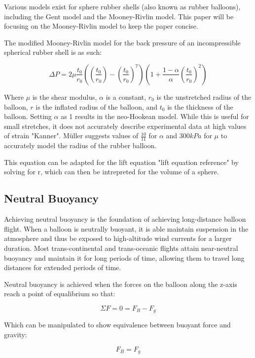 \documentclass[usenatbib]{mn2e}
\newcommand{\f}[2]{\frac{#1}{#2}}
\begin{document}
Various models exist for sphere rubber shells (also known as rubber balloons), including the Gent model and the Mooney-Rivlin model. This paper will be focusing on the Mooney-Rivlin model to keep the paper concise.

The modified Mooney-Rivlin model for the back pressure of an incompressible spherical rubber shell is as such:

\begin{equation}
\Delta P = 2\mu\frac{t_0}{r_0}((\frac{t_0}{r_0})-(\frac{t_0}{r_0})^7)(1+\frac{1-\alpha}{\alpha}(\frac{t_0}{r_0})^2)
\end{equation}

Where $\mu$ is the shear modulus, $\alpha$ is a constant, $r_0$ is the unstretched radius of the balloon, $r$ is the inflated radius of the balloon, and $t_0$ is the thickness of the balloon. Setting $\alpha$ as 1 results in the neo-Hookean model. While this is useful for small stretches, it does not accurately describe experimental data at high values of strain "Kanner". Müller suggests values of $\f{10}{11}$ for $\alpha$ and $300 kPa$ for $\mu$ to accurately model the radius of the rubber balloon.

This equation can be adapted for the lift equation "lift equation reference" by solving for r, which can then be intrepreted for the volume of a sphere.

\subsection{Neutral Buoyancy}

Achieving neutral buoyancy is the foundation of achieving long-distance balloon flight. When a balloon is neutrally buoyant, it is able maintain suspension in the atmosphere and thus be exposed to high-altitude wind currents for a larger duration. Most trans-continental and trans-oceanic flights attain near-neutral buoyancy and maintain it for long periods of time, allowing them to travel long distances for extended periods of time.

Neutral buoyancy is achieved when the forces on the balloon along the z-axis reach a point of equalibrium so that:

\begin{equation}
\Sigma F = 0 = F_B - F_g
\end{equation}

Which can be manipulated to show equivalence between buoyant force and gravity:

\begin{equation}
	F_B = F_g
\end{equation}
\end{document}
